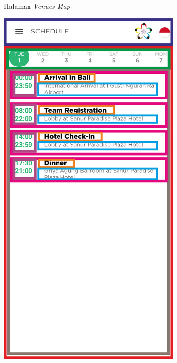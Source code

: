 \begin{itemize}
\begin{figure}[H]
\begin{subfigure}[b]{0.247\textwidth}
	    \caption{Halaman \textit{Venues Map}}
	    \label{fig:VenueMapPageWireframe}
     \end{subfigure}
	\begin{subfigure}[b]{0.247\textwidth}
    \centering
	    \includegraphics[scale=0.4]{Gambar/SchedulePageWireframe.png}

\end{subfigure}
\end{figure}
\end{itemize}
